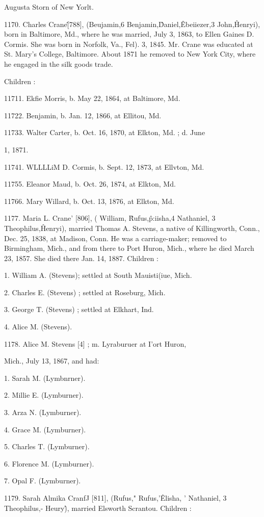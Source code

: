 \documentclass{book}
\begin{document}
Augusta Storn of New Yorlt. 

1170. Charles Crane\^ [788], (Beujamin,6 Benjamin,\^ Daniel,\^ 
Ebeiiezer,3 John,\^ Henryi), born in Baltimore, Md., where he 
was married, July 3, 1863, to Ellen Gaines D. Cormis. She was 
born in Norfolk, Va., Fel). 3, 1845. Mr. Crane was educated 
at St. Mary's College, Baltimore. About 1871 he removed to 
New York City, where he engaged in the silk goods trade. 

Children : 

11711. Ekfie Morris, b. May 22, 1864, at Baltimore, Md. 

11722. Benjamin, b. Jan. 12, 1866, at Ellitou, Md. 

11733. Walter Carter, b. Oct. 16, 1870, at Elkton, Md. ; d. June 

1, 1871. 

11741. WLLLLiM D. Cormis, b. Sept. 12, 1873, at Ellvton, Md. 

11755. Eleanor Maud, b. Oct. 26, 1874, at Elkton, Md. 

11766. Mary Willard, b. Oct. 13, 1876, at Elkton, Md. 

1177. Maria L. Crane' [806], ( William, \^ Rufus,\^ p:iisha,4 
Nathaniel, 3 Theophilus,\^ Henryi), married Thomas A. Stevens, 
a native of Killingworth, Conn., Dec. 25, 1838, at Madison, 
Conn. He was a carriage-maker; removed to Birmingham, 
Mich., and from there to Port Huron, Mich., where he died 
March 23, 1857. She died there Jan. 14, 1887. Children : 

1. William A. (Stevens); settled at South Mauisti(iue, Mich. 

2. Charles E. (Stevens) ; settled at Roseburg, Mich. 

3. George T. (Stevens) ; settled at Elkhart, Ind. 

4. Alice M. (Stevens). 

1178. Alice M. Stevens [4] ; m. Lyraburuer at I'ort Huron, 

Mich., July 13, 1867, and had: 

1. Sarah M. (Lymbnrner). 

2. Millie E. (Lymburner). 

3. Arza N. (Lymburner). 

4. Grace M. (Lymburner). 

5. Charles T. (Lymburner). 

6. Florence M. (Lymburner). 

7. Opal F. (Lymburner). 

1179. Sarah Almika CranfJ [811], (Rufus," Rufus,'\^ Elisha, ' 
Nathaniel, 3 Theophilus,- Heury\^), married Elsworth Scrantou. 
Children : 
\end{document}

